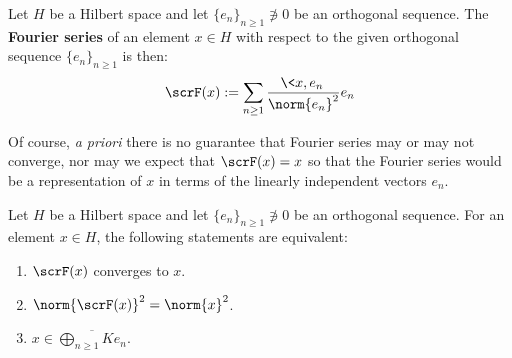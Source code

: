         \begin{definition} \label{def: fourier_series}
            Let $H$ be a Hilbert space and let $\{e_n\}_{n \geq 1} \not \ni 0$ be an orthogonal sequence. The \textbf{Fourier series} of an element $x \in H$ with respect to the given orthogonal sequence $\{e_n\}_{n \geq 1}$ is then:
                $$\scrF(x) := \sum_{n \geq 1} \frac{\<x, e_n\>}{\norm{e_n}^2} e_n$$
        \end{definition}
        Of course, \textit{a priori} there is no guarantee that Fourier series may or may not converge, nor may we expect that $\scrF(x) = x$ so that the Fourier series would be a representation of $x$ in terms of the linearly independent vectors $e_n$.
        \begin{theorem} \label{theorem: convergence_of_fourier_series}
            Let $H$ be a Hilbert space and let $\{e_n\}_{n \geq 1} \not \ni 0$ be an orthogonal sequence. For an element $x \in H$, the following statements are equivalent:
            \begin{enumerate}
                \item $\scrF(x)$ converges to $x$.
                \item $\norm{\scrF(x)}^2 = \norm{x}^2$.
                \item $x \in \overline{\bigoplus_{n \geq 1} K e_n}$.
            \end{enumerate}
        \end{theorem}
